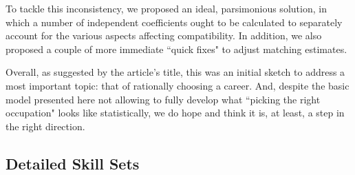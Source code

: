 \documentclass{article}
\begin{document}
To tackle this inconsistency, we proposed an ideal, parsimonious solution, in which a number of independent coefficients ought to be calculated to separately account for the various aspects affecting compatibility. In addition, we also proposed a couple of more immediate ``quick fixes" to adjust matching estimates.

Overall, as suggested by the article's title, this was an initial sketch to address a most important topic: that of rationally choosing a career. And, despite the basic model presented here not allowing to fully develop what ``picking the right occupation" looks like statistically, we do hope and think it is, at least, a step in the right direction.

\newpage
\printbibliography[
    heading=bibintoc,
    title={References}
]

\newpage
\begin{appendices}
    \section{Detailed Skill Sets}
    \DetailedSkillSets
\end{appendices}
\end{document}
